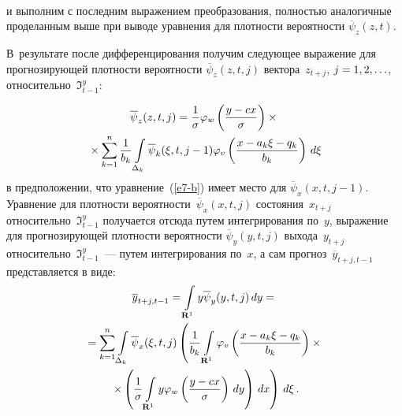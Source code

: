   
  \begin{figure}[b] %
\vspace*{1pt}
\begin{center}
\mbox{%
\epsfxsize=163.656mm
}
\end{center}
\vspace*{-6pt}
\vspace*{12pt}
\end{figure} 
    \begin{multicols}{2}
    
    \noindent
и выполним с последним выражением преоб\-ра\-зо\-вания, полностью аналогичные 
проделанным выше
 при выводе уравнения для плотности вероятности 
$\overline{\psi}_z(z,t)$. 



В~результате после дифференцирования получим следующее 
выражение для про\-гно\-зи\-ру\-ющей плотности вероятности $\overline{\psi}_z(z,t,j)$ 
вектора~$z_{t+j}$, $j\hm=1, 2, \ldots$, относительно~$\Im^y_{t-1}$:

\noindent
\begin{multline*}
\overline{\psi}_z(z,t,j)=\displaystyle\frac{\displaystyle 1\mathstrut}{\displaystyle \sigma\mathstrut}\varphi_w
\left( \displaystyle\frac{\displaystyle y-cx\mathstrut}{\displaystyle \sigma\mathstrut}\right)\times{}\\
{}\times \sum\limits_{k=1}^n \displaystyle\frac{\displaystyle 1\mathstrut}{\displaystyle b_k\mathstrut} 
\int\limits_{\Delta_k} \overline{\psi}_k(\xi,t,j-1)\varphi_v \left( 
\displaystyle\frac{\displaystyle x-a_k\xi-q_k\mathstrut}{\displaystyle b_k\mathstrut}\right)\,d\xi
\end{multline*}
в предположении, что уравнение~(\ref{e7-b}) имеет место для $\overline{\psi}_x(x,t,j-1)$. 
Уравнение для плотности вероятности~$\overline{\psi}_x(x,t,j)$ состояния~$x_{t+j}$ 
относительно~$\Im^y_{t-1}$ получается отсюда путем интегрирования по~$y$, выражение 
для прогнозирующей плотности вероятности $\overline{\psi}_y(y,t,j)$ выхода~$y_{t+j}$ 
относительно~$\Im^y_{t-1}$~--- путем интегрирования по~$x$, а сам 
прогноз~$\overline{y}_{t+j,t-1}$ представляется в виде:
\begin{multline*}
\overline{y}_{t+j,t-1}= \int\limits_{\mathbf{R}^1} y\overline{\psi}_y(y,t,j)\,dy={}\\
{}=\sum\limits_{k=1}^n \int\limits_{\Delta_k} \overline{\psi}_x(\xi,t,j)\left( \displaystyle\frac{\displaystyle 1\mathstrut}{\displaystyle b_k\mathstrut} 
\int\limits_{\mathbf{R}^1} \varphi_v\left( \displaystyle\frac{\displaystyle x-a_k\xi-q_k\mathstrut}{\displaystyle b_k\mathstrut}\right)\times{}\right.\\
{}\left.\times \left( \displaystyle\frac{\displaystyle 1\mathstrut}{\displaystyle \sigma\mathstrut} 
\int\limits_{\mathbf{R}^1} y \varphi_w \left( \displaystyle\frac{\displaystyle y-cx\mathstrut}{\displaystyle \sigma\mathstrut} \right) \,dy \right) \,dx \right) \,d\xi\,.
\end{multline*}


\end{multicols}
